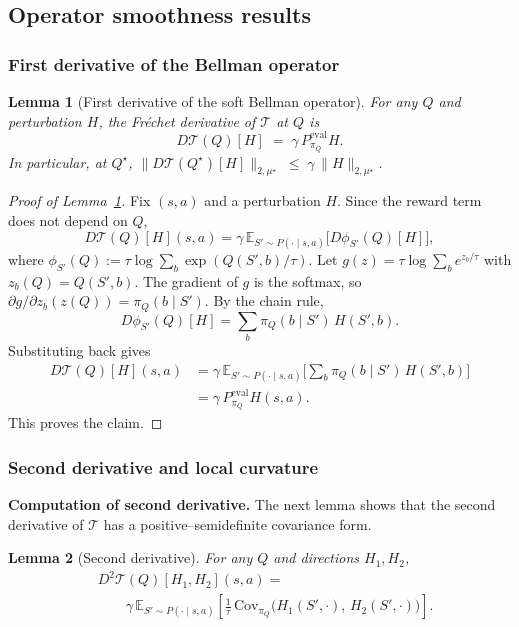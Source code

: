 \documentclass{article}
\theoremstyle{plain}
\newtheorem{lemma}{Lemma}
\theoremstyle{definition}
\theoremstyle{remark}
\newcommand{\E}{\mathbb{E}}
\begin{document}
\subsection{Operator smoothness results}

 \subsubsection{First derivative of the Bellman operator}


\begin{lemma}[First derivative of the soft Bellman operator]
\label{lem:first-derivative}
For any $Q$ and perturbation $H$, the Fréchet derivative of $\mathcal T$ at $Q$
is
\[
D\mathcal T(Q)[H] \;=\; \gamma\,P^{\mathrm{eval}}_{\pi_Q}H.
\]
In particular, at $Q^\star$, $\|D\mathcal T(Q^\star)[H]\|_{2,\mu^\star}
\;\le\;
\gamma\,\|H\|_{2,\mu^\star}$.
\end{lemma}

\begin{proof}[Proof of Lemma~\ref{lem:first-derivative}]
Fix $(s,a)$ and a perturbation $H$. Since the reward term does not depend on $Q$,
\[
D\mathcal{T}(Q)[H](s,a)
=
\gamma\,\E_{S'\sim P(\cdot\mid s,a)}
\big[D\phi_{S'}(Q)[H]\big],
\]
where $\phi_{S'}(Q) := \tau\log\sum_{b}\exp(Q(S',b)/\tau)$.
Let $g(z)=\tau\log\sum_{b}e^{z_b/\tau}$ with $z_b(Q)=Q(S',b)$.
The gradient of $g$ is the softmax, so
$\partial g/\partial z_b(z(Q))=\pi_Q(b\mid S')$.
By the chain rule,
\[
D\phi_{S'}(Q)[H]
=
\sum_{b}\pi_Q(b\mid S')\,H(S',b).
\]
Substituting back gives
\begin{align*}
D\mathcal T(Q)[H](s,a)
&=
\gamma\,\E_{S'\sim P(\cdot\mid s,a)}
\Big[\sum_{b}\pi_Q(b\mid S')\,H(S',b)\Big]
\\[0.3em]
&=
\gamma\,P^{\mathrm{eval}}_{\pi_Q}H(s,a).
\end{align*}
This proves the claim.
\end{proof}



\subsubsection{Second derivative and local curvature}


\textbf{Computation of second derivative.} The next lemma shows that the second derivative of $\mathcal{T}$ has a
positive–semidefinite covariance form.

\begin{lemma}[Second derivative]
\label{lem:second-derivative}
For any $Q$ and directions $H_1, H_2$,
\begin{align*}
&D^2\mathcal{T}(Q)[H_1,H_2](s,a)
=
\\[-0.3em]
&\qquad
\gamma\,\mathbb{E}_{S' \sim P(\cdot \mid s,a)}
\left[
    \tfrac{1}{\tau}\,
    \mathrm{Cov}_{\pi_Q}
    \bigl( H_1(S',\cdot),\, H_2(S',\cdot) \bigr)
\right].
\end{align*}
\end{lemma}
\end{document}
